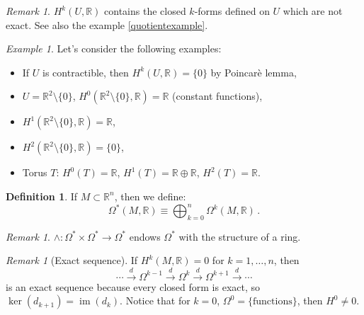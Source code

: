 \documentclass[a4paper,11pt,titlepage, article, oneside]{memoir}
\numberwithin{equation}{section}
\theoremstyle{definition}
\newtheorem{definition}[theorem]{Definition}
\theoremstyle{remark}
\newtheorem{remark}[theorem]{Remark}
\newtheorem{example}[theorem]{Example}
\DeclareMathOperator{\im}{im}
\newcommand{\rfield}{\mathbb{R}}
\begin{document}
\begin{remarkbox}\begin{remark}
  $H^k(U, \rfield)$ contains the closed $k$-forms defined on $U$ which are not exact. See also the example \ref{quotientexample}.
\end{remark}\end{remarkbox}

\begin{tcolorbox}\begin{example}
  Let's consider the following examples:
  \begin{itemize}
    \item If $U$ is contractible, then $H^k(U, \rfield) = \{0\}$ by Poincarè lemma,
    \item $U=\rfield^2 \setminus \{0\}$, $H^0(\rfield^2 \setminus \{0\}, \rfield) = \rfield$ (constant functions),
    \item $H^1(\rfield^2 \setminus \{0\}, \rfield) = \rfield$,
    \item $H^2(\rfield^2 \setminus \{0\}, \rfield) = \{0\}$,
    \item Torus $T$: $H^0(T) = \rfield$,  $H^1(T) = \rfield \oplus \rfield$, $H^2(T) = \rfield$.
  \end{itemize}
\end{example}\end{tcolorbox}

\begin{definition}
  If $M \subset \rfield^n$, then we define:
  \[  \Omega^*(M, \rfield) \equiv \bigoplus_{k=0}^n \Omega^k(M, \rfield) \, . \]
\end{definition}

\begin{remarkbox}\begin{remark}
  $\wedge \colon \Omega^* \times \Omega^* \rightarrow \Omega^*$ endows $\Omega^*$ with the structure of a ring.
\end{remark}\end{remarkbox}

\begin{remarkbox}\begin{remark} [Exact sequence] \label{exsequence}
  If $H^k(M, \rfield) = 0$ for $k=1, \ldots, n$, then
    $$\cdots \overset{d}{\longrightarrow} \Omega^{k-1} \overset{d}{\longrightarrow} \Omega^{k} \overset{d}{\longrightarrow} \Omega^{k+1} \overset{d}{\longrightarrow} \cdots $$
    is an exact sequence because every closed form is exact, so $\ker(d_{k+1}) = \im(d_k)$. Notice that for $k=0$, $\Omega^0 = \{\text{functions}\}$, then $H^0 \ne 0$.
\end{remark} \end{remarkbox}
\end{document}
